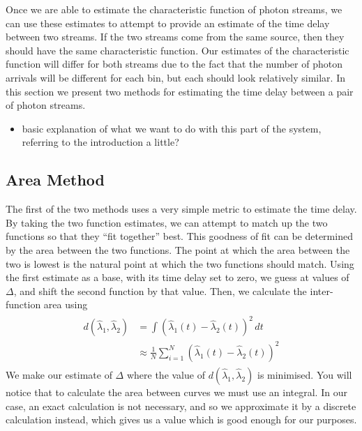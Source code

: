 \documentclass[a4paper,11pt]{article}
\begin{document}
Once we are able to estimate the characteristic function of photon streams, we
can use these estimates to attempt to provide an estimate of the time delay
between two streams. If the two streams come from the same source, then they
should have the same characteristic function. Our estimates of the
characteristic function will differ for both streams due to the fact that the
number of photon arrivals will be different for each bin, but each should look
relatively similar. In this section we present two methods for estimating the
time delay between a pair of photon streams.
\begin{itemize}
\item basic explanation of what we want to do with this part of the system,
  referring to the introduction a little?
\end{itemize}
\subsection{Area Method}
\label{sec-7-1}

The first of the two methods uses a very simple metric to estimate the time
delay. By taking the two function estimates, we can attempt to match up the two
functions so that they ``fit together'' best. This goodness of fit can be
determined by the area between the two functions. The point at which the area
between the two is lowest is the natural point at which the two functions should
match. Using the first estimate as a base, with its time delay set to zero, we
guess at values of $\Delta$, and shift the second function by that value. Then,
we calculate the inter-function area using
\begin{align}
\begin{split}
d(\hat{\lambda}_1,\hat{\lambda}_2)&=\int(\hat{\lambda}_1(t)-\hat{\lambda}_2(t))^2\,dt\\
&\approx\frac{1}{N}\sum_{i=1}^N(\hat{\lambda}_1(t)-\hat{\lambda}_2(t))^2
\end{split}
\end{align}
We make our estimate of $\Delta$ where the value of
$d(\hat{\lambda}_1,\hat{\lambda}_2)$ is minimised. You will notice that to
calculate the area between curves we must use an integral. In our case, an exact
calculation is not necessary, and so we approximate it by a discrete calculation
instead, which gives us a value which is good enough for our purposes.
      
\end{document}
